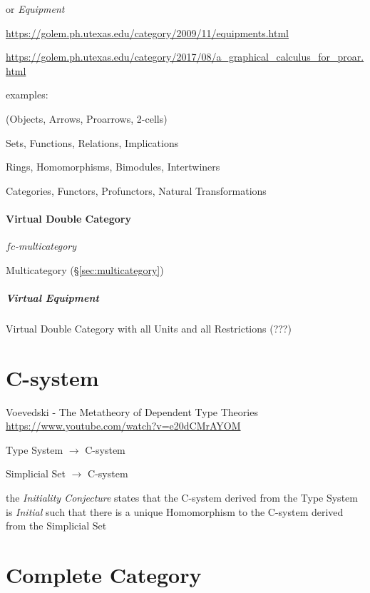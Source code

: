 or \emph{Equipment}

\url{https://golem.ph.utexas.edu/category/2009/11/equipments.html}

\url{https://golem.ph.utexas.edu/category/2017/08/a_graphical_calculus_for_proar.html}

examples:

(Objects, Arrows, Proarrows, 2-cells)

Sets, Functions, Relations, Implications

Rings, Homomorphisms, Bimodules, Intertwiners

Categories, Functors, Profunctors, Natural Transformations



\paragraph{Virtual Double Category}\label{sec:virtual_double_category}\hfill

\emph{$fc$-multicategory}

Multicategory (\S\ref{sec:multicategory})



\subparagraph{Virtual Equipment}\label{sec:virtual_equipment}\hfill

Virtual Double Category with all Units and all Restrictions (???)



\section{C-system}\label{sec:c_system}

Voevedski - The Metatheory of Dependent Type Theories
\url{https://www.youtube.com/watch?v=e20dCMrAYOM}

Type System $\rightarrow$ C-system

Simplicial Set $\rightarrow$ C-system

the \emph{Initiality Conjecture} states that the C-system derived from
the Type System is \emph{Initial} such that there is a unique
Homomorphism to the C-system derived from the Simplicial Set



\section{Complete Category}\label{sec:complete_category}

